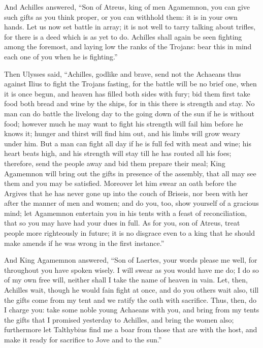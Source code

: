 And Achilles answered, “Son of Atreus, king of men Agamemnon, you can give
such gifts as you think proper, or you can withhold them: it is in your
own hands. Let us now set battle in array; it is not well to tarry talking
about trifles, for there is a deed which is as yet to do. Achilles shall
again be seen fighting among the foremost, and laying low the ranks of the
Trojans: bear this in mind each one of you when he is fighting.”

Then Ulysses said, “Achilles, godlike and brave, send not the Achaeans
thus against Ilius to fight the Trojans fasting, for the battle will be no
brief one, when it is once begun, and heaven has filled both sides with
fury; bid them first take food both bread and wine by the ships, for in
this there is strength and stay. No man can do battle the livelong day to
the going down of the sun if he is without food; however much he may want
to fight his strength will fail him before he knows it; hunger and thirst
will find him out, and his limbs will grow weary under him. But a man can
fight all day if he is full fed with meat and wine; his heart beats high,
and his strength will stay till he has routed all his foes; therefore,
send the people away and bid them prepare their meal; King Agamemnon will
bring out the gifts in presence of the assembly, that all may see them and
you may be satisfied. Moreover let him swear an oath before the Argives
that he has never gone up into the couch of Briseis, nor been with her
after the manner of men and women; and do you, too, show yourself of a
gracious mind; let Agamemnon entertain you in his tents with a feast of
reconciliation, that so you may have had your dues in full. As for you,
son of Atreus, treat people more righteously in future; it is no disgrace
even to a king that he should make amends if he was wrong in the first
instance.”

And King Agamemnon answered, “Son of Laertes, your words please me well,
for throughout you have spoken wisely. I will swear as you would have me
do; I do so of my own free will, neither shall I take the name of heaven
in vain. Let, then, Achilles wait, though he would fain fight at once, and
do you others wait also, till the gifts come from my tent and we ratify
the oath with sacrifice. Thus, then, do I charge you: take some noble
young Achaeans with you, and bring from my tents the gifts that I promised
yesterday to Achilles, and bring the women also; furthermore let
Talthybius find me a boar from those that are with the host, and make it
ready for sacrifice to Jove and to the sun.”

